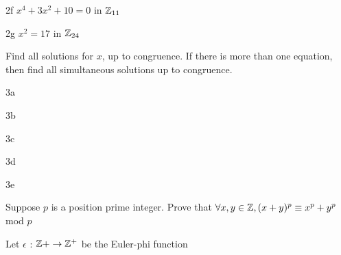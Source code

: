 \begin{question}{2f}
$x^4 + 3x^2 +10 = 0$ in $\mathbb{Z}_{11}$
\end{question}

\begin{question}{2g}
$x^2 = 17$ in $\mathbb{Z}_{24}$
\end{question}



\begin{question}{3}
Find all solutions for $x$, up to congruence. If there is more than one equation, then find all simultaneous solutions up to congruence.
\end{question}


\begin{question}{3a}

\end{question}

\begin{question}{3b}

\end{question}

\begin{question}{3c}

\end{question}

\begin{question}{3d}

\end{question}

\begin{question}{3e}

\end{question}


\begin{question}{4}
Suppose $p$ is a position prime integer. Prove that $\forall x,y \in \mathbb{Z}, (x+y)^p \equiv x^p + y^p$ mod $p$
\end{question}


\begin{question}{5}
Let $\epsilon$ : $\mathbb{Z}+ \rightarrow \mathbb{Z}^+$ be the Euler-phi function
\end{question}


